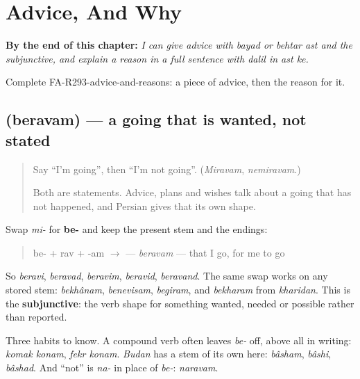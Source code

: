 
\chapter{Advice, And Why}
\label{ch:fa-advice-and-why}

\begin{chapteropening}
\textbf{By the end of this chapter:} \emph{I can give advice with bayad or behtar ast and the subjunctive, and explain a reason in a full sentence with dalil in ast ke.}

Complete FA-R293-advice-and-reasons: a piece of advice, then the reason for it.
\end{chapteropening}

\section[\texorpdfstring{\fa{بروم} (beravam)}{بروم (beravam)}]{ (beravam) — a going that is wanted, not stated}

\label{lesson:FA-C293-beravam}



\begin{quote}
Say \textquotedblleft{}I'm going\textquotedblright{}, then \textquotedblleft{}I'm not going\textquotedblright{}. (\emph{Miravam}, \emph{nemiravam}.)

Both are statements. Advice, plans and wishes talk about a going that has not happened, and Persian gives that its own shape.
\end{quote}

\begin{grammarlens}[title={Grammar Lens: be- in place of mi-}]
Swap \emph{mi-} for \textbf{be-} and keep the present stem and the endings:

\begin{quote}
be- + rav + -am $\to$ \textbf{} — \emph{beravam} — that I go, for me to go
\end{quote}

So \emph{beravi}, \emph{beravad}, \emph{beravim}, \emph{beravid}, \emph{beravand}. The same swap works on any stored stem: \emph{bekhânam}, \emph{benevisam}, \emph{begiram}, and \emph{bekharam} from \emph{kharidan}. This is the \textbf{subjunctive}: the verb shape for something wanted, needed or possible rather than reported.

Three habits to know. A compound verb often leaves \emph{be-} off, above all in writing: \emph{komak konam}, \emph{fekr konam}. \emph{Budan} has a stem of its own here: \emph{bâsham}, \emph{bâshi}, \emph{bâshad}. And \textquotedblleft{}not\textquotedblright{} is \emph{na-} in place of \emph{be-}: \emph{naravam}.
\end{grammarlens}

